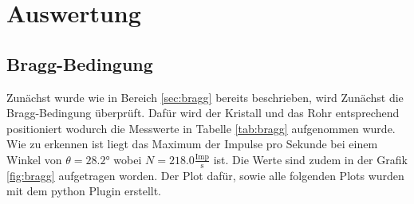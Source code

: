 \section{Auswertung}
\label{sec:Auswertung}
\subsection{Bragg-Bedingung}
Zunächst wurde wie in Bereich \ref{sec:bragg} bereits beschrieben, wird Zunächst die Bragg-Bedingung überprüft.
Dafür wird der Kristall und das Rohr entsprechend positioniert wodurch die Messwerte in Tabelle \ref{tab:bragg} aufgenommen wurde.
Wie zu erkennen ist liegt das Maximum der Impulse pro Sekunde bei einem Winkel von $\theta = 28.2 \si{\degree} $ wobei $N = 218.0 \frac{\text{Imp}}{\si{\second}}$ ist.
Die Werte sind zudem in der Grafik \ref{fig:bragg} aufgetragen worden.
Der Plot dafür, sowie alle folgenden Plots wurden mit dem python Plugin \cite{matplotlib} erstellt.
